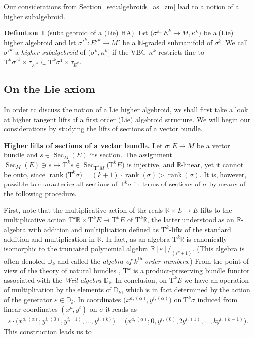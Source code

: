 \documentclass[pdftex]{sigma}
\newcommand{\ZM}{{VBC}} %
\newcommand{\thh}[1]{#1^{\mathrm{th}}} %
\newcommand{\R}{\mathbb{R}}
\newcommand{\N}{\mathbb{N}}
\newcommand{\D}{\mathbb{D}}
\newcommand{\Sec}{\operatorname{Sec}}
\newcommand{\rank}{\operatorname{rank}}
\newcommand{\ra}{\rightarrow}
\newcommand{\eps}{\varepsilon}
\newcommand{\TT}[1]{\mathrm{T}^{#1}} %
\def\<#1>{\left\langle #1\right\rangle}
\numberwithin{equation}{section}
\theoremstyle{definition}
\newtheorem{df}[thm]{Definition}
\begin{document}
 Our considerations from Section~\ref{sec:algebroids_as_zm} lead to a notion of a higher subalgebroid.
\begin{df}[subalgebroid of a (Lie) HA]\label{def:higher_sub_algebroid} Let $\big(\sigma^k\colon E^k\ra M, \kappa^k\big)$ be a (Lie) higher algebroid and let ${\sigma'}^{k}\colon {E'}^{k}\ra M'$ be a $\N$-graded submanifold of $\sigma^k$. We call ${\sigma'}^{k}$ a \emph{higher subalgebroid} of $\big(\sigma^k,\kappa^k\big)$ if the \ZM\ $\kappa^k$ restricts fine to $\TT{k}{\sigma'}^1\times\tau_{{E'}^k}\subset\TT{k}\sigma^1\times\tau_{E^k}$.
\end{df}

\subsection{On the Lie axiom}\label{ssec:higher_lie}

In order to discuss the notion of a Lie higher algebroid, we shall first take a look at higher tangent lifts of a first order (Lie) algebroid structure. We will begin our considerations by studying the lifts of sections of a vector bundle.

{\bf Higher lifts of sections of a vector bundle.} Let $\sigma\colon E\ra M$ be a vector bundle and $s\in\Sec_M(E)$ its section. The assignment $\Sec_M(E)\ni s\mapsto \TT{k} s\in\Sec_{\TT{k} M}\big(\TT{k} E\big)$ is injective, and $\R$-linear, yet it cannot be onto, since $\rank\big(\TT{k}\sigma\big)=(k+1)\cdot\rank(\sigma) > \rank(\sigma)$. It is, however, possible to characterize all sections of $\TT{k}\sigma$ in terms of sections of $\sigma$ by means of the following procedure.

First{,} note that the multiplicative action of the reals $\R\times E\ra E$ lifts to the multiplicative action $\TT{k}\R\times\TT{k} E\ra\TT{k} E$ of $\TT{k}\R$, the latter understood as an $\R$-algebra with addition and multiplication defined as $\TT{k}$-lifts of the standard addition and multiplication in $\R$. In fact, as an algebra $\TT{k}\R$ is canonically isomorphic to the truncated polynomial algebra $\R[\eps]/_{\<\eps^{k+1}>}$. (This algebra is often denoted $\D_k$ and called the \emph{algebra of $\thh{k}$-order numbers}.) From the point of view of the theory of natural bundles \cite{KMS_1993}, $\TT{k}$ is a product-preserving bundle functor associated with the \emph{Weil algebra} $\D_k$. In conclusion, on $\TT{k} E$ we have an operation of multiplication by the elements of $\D_k$, which is in fact determined by the action of the generator $\eps\in\D_k$. In coordinates $\big(x^{a,(\alpha)},y^{i,(\alpha)}\big)$ on $\TT{k}\sigma$ induced from linear coordinates $(x^a,y^i)$ on $\sigma$ it reads as
\begin{gather*}\eps\cdot \big(x^{a,(\alpha)};y^{i,(0)},y^{i,(1)},\hdots,y^{i,(k)}\big)=
\big(x^{a,(\alpha)};0, y^{i,(0)}, 2 y^{i, (1)}, \hdots,k y^{i,(k-1)}\big).\end{gather*}
This construction leads us to
\end{document}
